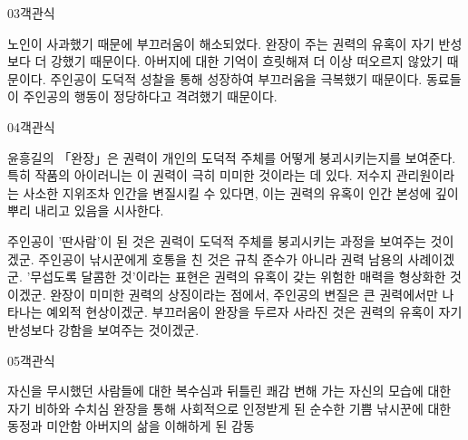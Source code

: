 \documentclass[fs85,seriesWit]{korfarm-base}
\begin{document}
\begin{kfQBlock}{03}{객관식}
\begin{kfChoices}
\kfChoice 노인이 사과했기 때문에 부끄러움이 해소되었다.
\kfChoice 완장이 주는 권력의 유혹이 자기 반성보다 더 강했기 때문이다.
\kfChoice 아버지에 대한 기억이 흐릿해져 더 이상 떠오르지 않았기 때문이다.
\kfChoice 주인공이 도덕적 성찰을 통해 성장하여 부끄러움을 극복했기 때문이다.
\kfChoice 동료들이 주인공의 행동이 정당하다고 격려했기 때문이다.
\end{kfChoices}
\end{kfQBlock}

\begin{kfQBlock}{04}{객관식}
\begin{kfEvidence}윤흥길의 「완장」은 권력이 개인의 도덕적 주체를 어떻게 붕괴시키는지를 보여준다. 특히 작품의 아이러니는 이 권력이 극히 미미한 것이라는 데 있다. 저수지 관리원이라는 사소한 지위조차 인간을 변질시킬 수 있다면, 이는 권력의 유혹이 인간 본성에 깊이 뿌리 내리고 있음을 시사한다.\end{kfEvidence}
\begin{kfChoices}
\kfChoice 주인공이 '딴사람'이 된 것은 권력이 도덕적 주체를 붕괴시키는 과정을 보여주는 것이겠군.
\kfChoice 주인공이 낚시꾼에게 호통을 친 것은 규칙 준수가 아니라 권력 남용의 사례이겠군.
\kfChoice '무섭도록 달콤한 것'이라는 표현은 권력의 유혹이 갖는 위험한 매력을 형상화한 것이겠군.
\kfChoice 완장이 미미한 권력의 상징이라는 점에서, 주인공의 변질은 큰 권력에서만 나타나는 예외적 현상이겠군.
\kfChoice 부끄러움이 완장을 두르자 사라진 것은 권력의 유혹이 자기 반성보다 강함을 보여주는 것이겠군.
\end{kfChoices}
\end{kfQBlock}

\begin{kfQBlock}{05}{객관식}
\begin{kfChoices}
\kfChoice 자신을 무시했던 사람들에 대한 복수심과 뒤틀린 쾌감
\kfChoice 변해 가는 자신의 모습에 대한 자기 비하와 수치심
\kfChoice 완장을 통해 사회적으로 인정받게 된 순수한 기쁨
\kfChoice 낚시꾼에 대한 동정과 미안함
\kfChoice 아버지의 삶을 이해하게 된 감동
\end{kfChoices}
\end{kfQBlock}

\kfEndMC
\end{document}
